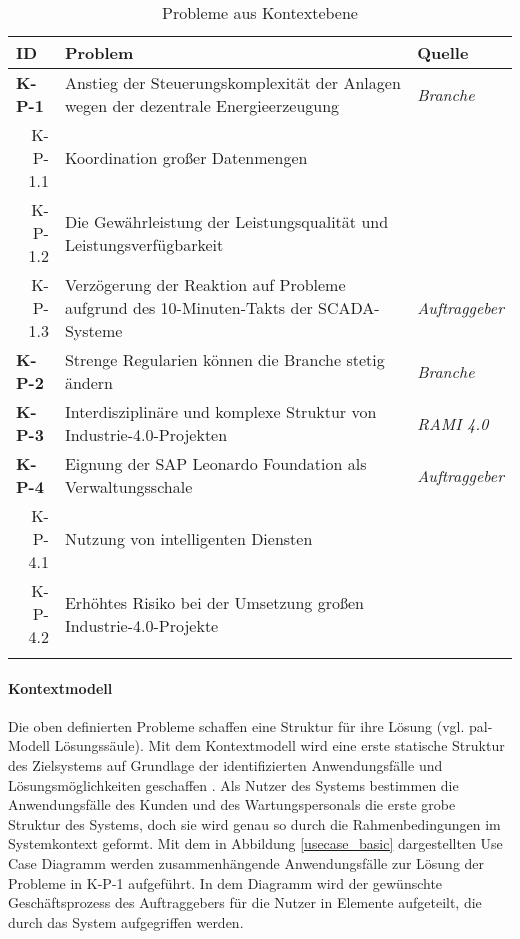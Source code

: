 \begin{table}[H]
  \begin{tabularx}{\textwidth}{@{}lXp{2cm}@{}}
      \toprule
      ID                & Problem & Quelle \\
      \midrule
      \textbf{K-P-1}              &       Anstieg der Steuerungskomplexität der Anlagen wegen der dezentrale Energieerzeugung               & \textit{Branche}                \\
      \multicolumn{1}{r}{K-P-1.1} &  Koordination großer Datenmengen     \\
      \multicolumn{1}{r}{K-P-1.2} &  Die Gewährleistung der Leistungsqualität und Leistungsverfügbarkeit \\
      \multicolumn{1}{r}{K-P-1.3} &  Verzögerung der Reaktion auf Probleme aufgrund des 10-Minuten-Takts der SCADA-Systeme & \textit{Auftraggeber} \\\addlinespace
      \textbf{K-P-2}              & Strenge Regularien können die Branche stetig ändern                     & \textit{Branche}                \\ \addlinespace
      \textbf{K-P-3}              & Interdisziplinäre und komplexe Struktur von Industrie-4.0-Projekten                      & \textit{RAMI 4.0}                \\
      \textbf{K-P-4}              &  Eignung der SAP Leonardo Foundation als Verwaltungsschale  & \textit{Auftraggeber} \\
      \multicolumn{1}{r}{K-P-4.1} &  Nutzung von intelligenten Diensten\\
      \multicolumn{1}{r}{K-P-4.2} &  Erhöhtes Risiko bei der Umsetzung großen Industrie-4.0-Projekte\\
      \addlinespace
      \bottomrule
  \end{tabularx}
  \label{kontext_probleme}
  \caption{Probleme aus Kontextebene}
\end{table}

\paragraph{Kontextmodell}

Die oben definierten Probleme schaffen eine Struktur für ihre Lösung (vgl. \ac{pal}-Modell Lösungssäule). Mit dem  Kontextmodell wird eine erste statische Struktur des Zielsystems auf Grundlage der identifizierten Anwendungsfälle und Lösungsmöglichkeiten geschaffen \citep{Lauenroth2016}. Als Nutzer des Systems bestimmen die Anwendungsfälle des Kunden und des Wartungspersonals die erste grobe Struktur des Systems, doch sie wird genau so durch die Rahmenbedingungen im Systemkontext geformt.
Mit dem in Abbildung \ref{usecase_basic} dargestellten Use Case Diagramm werden zusammenhängende Anwendungsfälle zur Lösung der Probleme in K-P-1 aufgeführt. In dem Diagramm wird der gewünschte Geschäftsprozess des Auftraggebers für die Nutzer in Elemente aufgeteilt, die durch das System aufgegriffen werden.

